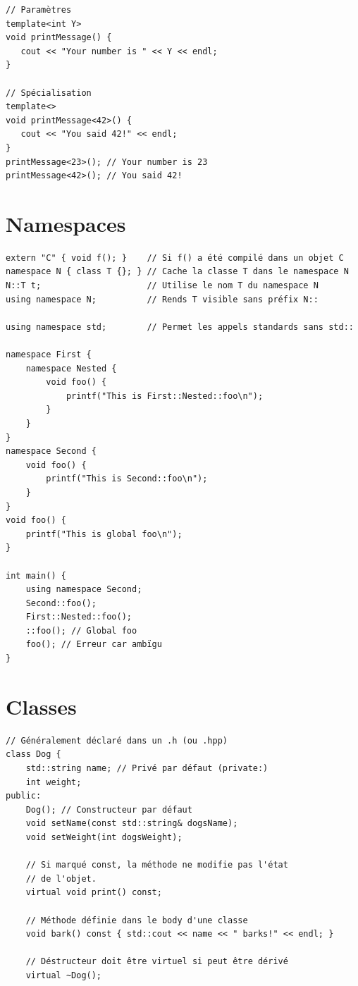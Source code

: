 \documentclass{article}
\begin{document}
\begin{multicols*}{3}
\begin{lstlisting}
// Paramètres
template<int Y>
void printMessage() {
   cout << "Your number is " << Y << endl;
}

// Spécialisation
template<>
void printMessage<42>() {
   cout << "You said 42!" << endl;
}
printMessage<23>(); // Your number is 23
printMessage<42>(); // You said 42!

\end{lstlisting}

\section*{Namespaces}

\begin{lstlisting}
extern "C" { void f(); }    // Si f() a été compilé dans un objet C
namespace N { class T {}; } // Cache la classe T dans le namespace N
N::T t;                     // Utilise le nom T du namespace N
using namespace N;          // Rends T visible sans préfix N::

using namespace std;        // Permet les appels standards sans std::

namespace First {
    namespace Nested {
        void foo() {
            printf("This is First::Nested::foo\n");
        }
    }
}
namespace Second {
    void foo() {
        printf("This is Second::foo\n");
    }
}
void foo() {
    printf("This is global foo\n");
}

int main() {
    using namespace Second;
    Second::foo();
    First::Nested::foo();
    ::foo(); // Global foo
    foo(); // Erreur car ambïgu
}
\end{lstlisting}

\section*{Classes}

\begin{lstlisting}
// Généralement déclaré dans un .h (ou .hpp)
class Dog {
    std::string name; // Privé par défaut (private:)
    int weight;
public:
    Dog(); // Constructeur par défaut
    void setName(const std::string& dogsName);
    void setWeight(int dogsWeight);

    // Si marqué const, la méthode ne modifie pas l'état
    // de l'objet.
    virtual void print() const;

    // Méthode définie dans le body d'une classe
    void bark() const { std::cout << name << " barks!" << endl; }

    // Déstructeur doit être virtuel si peut être dérivé
    virtual ~Dog();


\end{lstlisting}
\end{multicols*}
\end{document}
